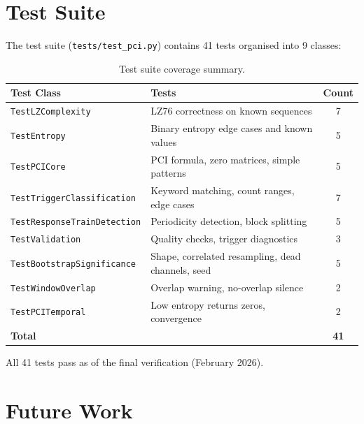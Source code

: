 \documentclass[11pt,a4paper]{article}
\begin{document}
\section{Test Suite}
\label{sec:tests}

The test suite (\texttt{tests/test\_pci.py}) contains 41 tests organised into 9 classes:

\begin{table}[H]
\centering
\caption{Test suite coverage summary.}
\label{tab:tests}
\begin{tabular}{@{}llc@{}}
\toprule
\textbf{Test Class} & \textbf{Tests} & \textbf{Count} \\
\midrule
\texttt{TestLZComplexity}          & LZ76 correctness on known sequences              & 7 \\
\texttt{TestEntropy}               & Binary entropy edge cases and known values        & 5 \\
\texttt{TestPCICore}               & PCI formula, zero matrices, simple patterns       & 5 \\
\texttt{TestTriggerClassification} & Keyword matching, count ranges, edge cases        & 7 \\
\texttt{TestResponseTrainDetection}& Periodicity detection, block splitting            & 5 \\
\texttt{TestValidation}            & Quality checks, trigger diagnostics               & 3 \\
\texttt{TestBootstrapSignificance} & Shape, correlated resampling, dead channels, seed & 5 \\
\texttt{TestWindowOverlap}         & Overlap warning, no-overlap silence               & 2 \\
\texttt{TestPCITemporal}           & Low entropy returns zeros, convergence            & 2 \\
\midrule
\textbf{Total}                     &                                                   & \textbf{41} \\
\bottomrule
\end{tabular}
\end{table}

All 41 tests pass as of the final verification (February 2026).

\section{Future Work}
\label{sec:future}
\end{document}
